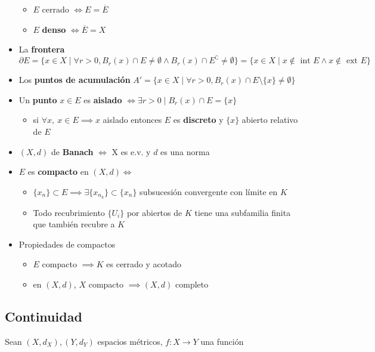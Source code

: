 \documentclass[a4paper,twocolumn]{extarticle}
\newcommand{\Int}{\text{ int }}
\newcommand{\Ext}{\text{ ext }}
\begin{document}
\begin{itemize}
	\begin{itemize}
		\item $E$ cerrado $\iff E = \overline{E}$
		\item $E$ \textbf{denso} $\iff \overline{E} = X$
	\end{itemize}
	\item La \textbf{frontera} $\partial E = \{x \in X \mid \forall r > 0, B_r(x) \cap E \neq \emptyset \land B_r(x) \cap E^\complement \neq \emptyset\} = \{x \in X \mid x \not\in \Int E \land x \not\in \Ext E\}$
	\item Los \textbf{puntos de acumulación} $A' = \{x \in X \mid \forall r > 0, B_r(x) \cap E \setminus\{x\} \neq \emptyset \}$
	\item Un \textbf{punto} $x \in E$ es \textbf{aislado} $\iff \exists r > 0 \mid B_r(x) \cap E = \{x\}$
	\begin{itemize}
		\item  si $\forall x,\ x \in E \implies x$ aislado entonces $E$ es \textbf{discreto} y $\{x\}$ abierto relativo de $E$
	\end{itemize}
	\item $(X,d)$ de \textbf{Banach} $\iff$ X es e.v. y $d$ es una norma
	\item $E$ es \textbf{compacto} en $(X,d) \iff$
	\begin{itemize}
		\item $\{x_n\} \subset E \implies \exists \{x_{n_k}\} \subset \{x_n\}$ subsucesión convergente con límite en $K$
		\item Todo recubrimiento $\{U_i\}$ por abiertos de $K$ tiene una subfamilia finita que también recubre a $K$
	\end{itemize}
	\item Propiedades de compactos
	\begin{itemize}
		\item $E$ compacto $\implies K$ es cerrado y acotado
		\item en $(X,d)$, $X$ compacto $\implies (X,d)$ completo
	\end{itemize}
\end{itemize}

\subsection{Continuidad}

Sean $(X, d_X), (Y, d_Y)$ espacios métricos, $f:X \to Y$ una función
\end{document}
